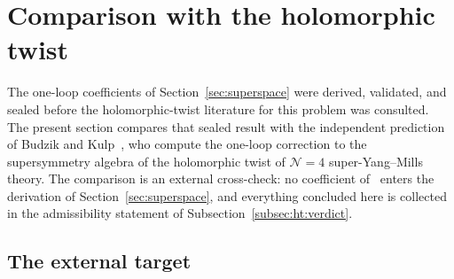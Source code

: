 \section{Comparison with the holomorphic twist}\label{sec:ht}

The one-loop coefficients of Section~\ref{sec:superspace} were derived,
validated, and sealed before the holomorphic-twist literature for this problem
was consulted. The present section compares that sealed result with the
independent prediction of Budzik and Kulp~\cite{BK}, who compute the one-loop
correction to the supersymmetry algebra of the holomorphic twist of
$\mathcal N=4$ super-Yang--Mills theory. The comparison is an external
cross-check: no coefficient of~\cite{BK} enters the derivation of
Section~\ref{sec:superspace}, and everything concluded here is collected in
the admissibility statement of Subsection~\ref{subsec:ht:verdict}.

\subsection{The external target}\label{subsec:ht:target}

